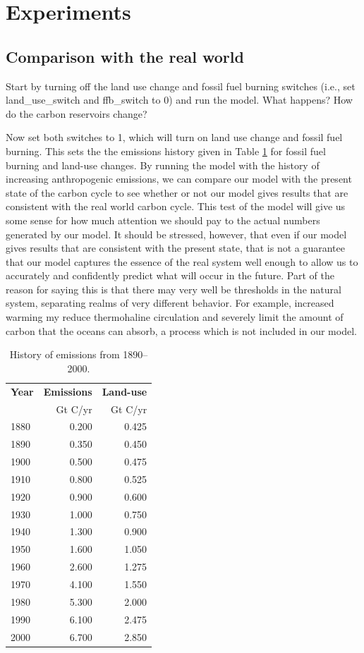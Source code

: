 \documentclass[11pt,letterpaper]{article}
\begin{document}
\section{Experiments}
\subsection{Comparison with the real world}
Start by turning off the land use change and fossil fuel burning switches (i.e., set land\_use\_switch and ffb\_switch to 0) and run the model. What happens? How do the carbon reservoirs change?

Now set both switches to 1, which will turn on land use change and fossil fuel burning. This sets the the emissions history given in Table \ref{table:emissions} for fossil fuel burning and land-use changes. By running the model with the history of increasing anthropogenic emissions, we can compare our model with the present state of the carbon cycle to see whether or not our model gives results that are consistent with the real world carbon cycle. This test of the model will give us some sense for how much attention we should pay to the actual numbers generated by our model. It should be stressed,
however, that even if our model gives results that are consistent with the present state, that is not a guarantee that our model captures the essence of the real system well enough to allow us to accurately and confidently predict what will occur in the future. Part of the reason for saying this is that there may very well be thresholds in the natural system, separating realms of very different behavior. For example, increased warming my reduce thermohaline circulation and severely limit the amount of carbon that the oceans can absorb, a process which is not included in our model.

\begin{table}[h]
\begin{center}
\begin{tabular}{lrr}
\textbf{Year} & \textbf{Emissions} & \textbf{Land-use} \\
& Gt C/yr & Gt C/yr\\
\hline
1880 & 0.200 & 0.425 \\
1890 & 0.350 & 0.450\\
1900 & 0.500 & 0.475\\
1910 & 0.800 & 0.525\\
1920 & 0.900 & 0.600\\
1930 & 1.000 & 0.750\\
1940 & 1.300 & 0.900\\
1950 & 1.600 & 1.050\\
1960 & 2.600 & 1.275\\
1970 & 4.100 & 1.550\\
1980 & 5.300 & 2.000\\
1990 & 6.100 & 2.475\\
2000 & 6.700 & 2.850\\
\hline 
\end{tabular}
\end{center}
\label{table:emissions}
\caption{History of emissions from 1890--2000.}
\end{table}
\end{document}
